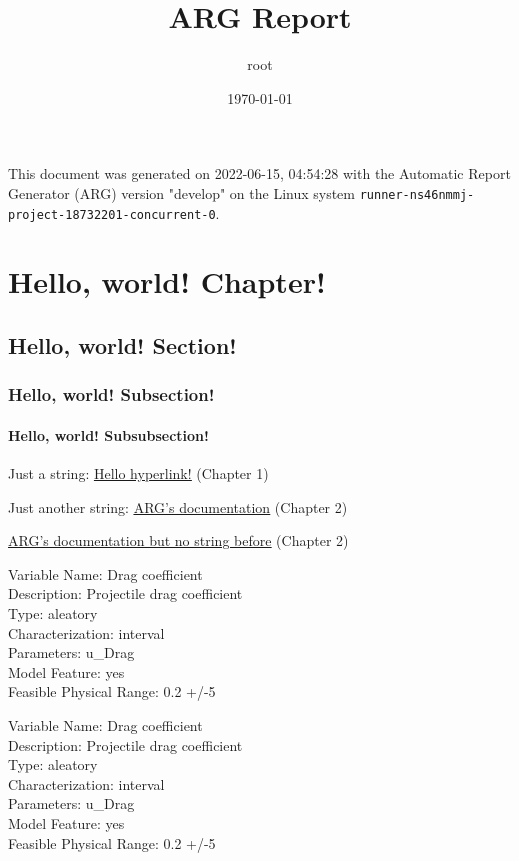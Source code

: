 \documentclass[letter,titlepage,oneside,11pt]{report}%
\title{\textbf{ARG Report}}%
\author{root}%
\date{\today}%
\begin{document}
%
\normalsize%
\maketitle%
\cleardoublepage%
This document was generated on 2022-06-15, 04:54:28 with the Automatic Report Generator (ARG) version "develop" on the Linux system \texttt{runner-ns46nmmj-project-18732201-concurrent-0}.%
\cleardoublepage%
\tableofcontents%
\listoffigures%
\listoftables%
\cleardoublepage%
\chapter{Hello, world! Chapter!}%
\par%
\section{Hello, world! Section!}%
\par%
\subsection{Hello, world! Subsection!}%
\par%
\subsubsection{Hello, world! Subsubsection!}%
\par%
\par%
Just a string: %
\href{expected/build_tests-hello_world-Report-LaTeX.pdf}{\underline{Hello hyperlink!}}%
 (Chapter 1)%
\\%
\par%
Just another string: %
\href{https://automaticreportgenerator.gitlab.io/arg/}{\underline{ARG's documentation}}%
 (Chapter 2)%
\\%
\par%
\href{https://automaticreportgenerator.gitlab.io/arg/}{\underline{ARG's documentation but no string before}}%
 (Chapter 2)%
\\%
\par%
Variable Name: Drag coefficient\\Description: Projectile drag coefficient\\Type: aleatory\\Characterization: interval\\Parameters: u_Drag\\Model Feature: yes\\Feasible Physical Range: 0.2 +/-5%
\par%
Variable Name: Drag coefficient\\Description: Projectile drag coefficient\\Type: aleatory\\Characterization: interval\\Parameters: u_Drag\\Model Feature: yes\\Feasible Physical Range: 0.2 +/-5%
\end{document}
